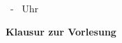 \VariableInstitusname \hfill \VariableUniversitaetname\\
\VariableDozent \hfill \VariableKlausurtag \\
\VariableUebungsleiter \hfill \VariableStartzeit~- \VariableEndzeit~Uhr\\
\begin{center}
{\Large\bf Klausur zur Vorlesung}\\[5mm]
{\LARGE\it \VariableVeranstaltungsname}\\[5mm]
\VariableKlausurjahr\\[1cm]
\end{center}